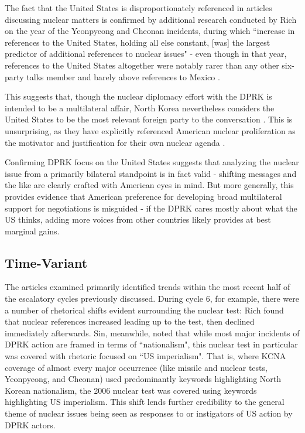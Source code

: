 The fact that the United States is disproportionately referenced in articles discussing nuclear matters is confirmed by additional research conducted by Rich on the year of the Yeonpyeong and Cheonan incidents, during which ``increase in references to the United States, holding all else constant, [was] the largest predictor of additional references to nuclear issues" - even though in that year, references to the United States altogether were notably rarer than any other six-party talks member and barely above references to Mexico \cite{rich12}.

This suggests that, though the nuclear diplomacy effort with the DPRK is intended to be a multilateral affair, North Korea nevertheless considers the United States to be the most relevant foreign party to the conversation \cite{rich14}. This is unsurprising, as they have explicitly referenced American nuclear proliferation as the motivator and justification for their own nuclear agenda \cite{kcna, kcna3, kcna4}.

Confirming DPRK focus on the United States suggests that analyzing the nuclear issue from a primarily bilateral standpoint is in fact valid - shifting messages and the like are clearly crafted with American eyes in mind. But more generally, this provides evidence that American preference for developing broad multilateral support for negotiations is misguided - if the DPRK cares mostly about what the US thinks, adding more voices from other countries likely provides at best marginal gains.

\subsection{Time-Variant}

The articles examined primarily identified trends within the most recent half of the escalatory cycles previously discussed. During cycle 6, for example, there were a number of rhetorical shifts evident surrounding the nuclear test: Rich found that nuclear references increased leading up to the test, then declined immediately afterwards\cite{rich14}. Sin, meanwhile, noted that while most major incidents of DPRK action are framed in terms of ``nationalism", this nuclear test in particular was covered with rhetoric focused on ``US imperialism"\cite{sin}. That is, where KCNA coverage of almost every major occurrence (like missile and nuclear tests, Yeonpyeong, and Cheonan) used predominantly keywords highlighting North Korean nationalism, the 2006 nuclear test was covered using keywords highlighting US imperialism. This shift lends further credibility to the general theme of nuclear issues being seen as responses to or instigators of US action by DPRK actors.

